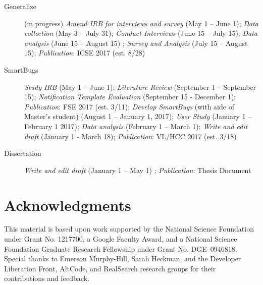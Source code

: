 \documentclass{llncs}
\begin{document}
\begin{description}
	\item[Generalize] (in progress) \textit{Amend IRB for interviews and survey} (May 1 -- June 1); \textit{Data collection} (May 3 -- July 31); \textit{Conduct Interviews} (June 15 -- July 15); \textit{Data analysis} (June 15 -- August 15) ; \textit{Survey and Analysis} (July 15 -- August 15); \textit{Publication}: ICSE 2017 (est. 8/28)
	\item[SmartBugs] \textit{Study IRB} (May 1 -- June 1); \textit{Literature Review} (September 1 -- September 15); \textit{Notification Template Evaluation} (September 15 - December 1); \textit{Publication}: FSE 2017 (est. 3/11); \textit{Develop SmartBugs} (with aide of Master's student) (August 1 -- January 1, 2017); \textit{User Study} (January 1 -- February 1 2017); \textit{Data analysis} (February 1 -- March 1); \textit{Write and edit draft} (January 1 - March 18); \textit{Publication}: VL/HCC 2017 (est. 3/18)
	\item[Dissertation] \textit{Write and edit draft} (January 1 -- May 1) ; \textit{Publication}: Thesis Document
\end{description}





\section*{Acknowledgments}
This material is based upon work supported by the National Science Foundation under
Grant No. 1217700, a Google Faculty Award, and a National Science Foundation
Graduate Research Fellowship under Grant No. DGE--0946818.
Special thanks to Emerson Murphy-Hill, Sarah Heckman, and the Developer Liberation Front, AltCode, and RealSearch research groups for their contributions and feedback.




%

%
\end{document}
